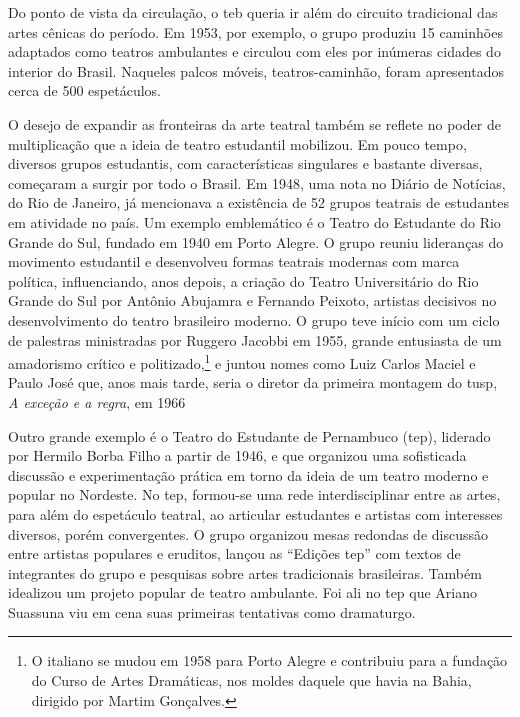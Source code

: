 Do ponto de vista da circulação, o {\sc teb} queria ir além do circuito
tradicional das artes cênicas do período. Em 1953, por exemplo, o grupo
produziu 15 caminhões adaptados como teatros ambulantes e circulou com
eles por inúmeras cidades do interior do Brasil. Naqueles palcos móveis,
teatros-caminhão, foram apresentados cerca de 500 espetáculos.

\subject{Constituição de uma cena estudantil no teatro brasileiro dos anos
1940 e 1950}

O desejo de expandir as fronteiras da arte teatral também se reflete no
poder de multiplicação que a ideia de teatro estudantil mobilizou. Em
pouco tempo, diversos grupos estudantis, com características singulares
e bastante diversas, começaram a surgir por todo o Brasil. Em 1948, uma
nota no Diário de Notícias, do Rio de Janeiro, já mencionava a
existência de 52 grupos teatrais de estudantes em atividade no país. Um
exemplo emblemático é o Teatro do Estudante do Rio Grande do Sul,
fundado em 1940 em Porto Alegre. O grupo reuniu lideranças do movimento
estudantil e desenvolveu formas teatrais modernas com marca política,
influenciando, anos depois, a criação do Teatro Universitário do Rio
Grande do Sul por Antônio Abujamra e Fernando Peixoto, artistas
decisivos no desenvolvimento do teatro brasileiro moderno. O grupo teve
início com um ciclo de palestras ministradas por Ruggero Jacobbi em
1955, grande entusiasta de um amadorismo crítico e
politizado,\footnote{O italiano se mudou em 1958 para Porto Alegre e
  contribuiu para a fundação do Curso de Artes Dramáticas, nos moldes
  daquele que havia na Bahia, dirigido por Martim Gonçalves.} e juntou
nomes como Luiz Carlos Maciel e Paulo José que, anos mais tarde, seria o
diretor da primeira montagem do {\sc tusp}, {\it A exceção e a regra}, em 1966

Outro grande exemplo é o Teatro do Estudante de Pernambuco ({\sc tep}),
liderado por Hermilo Borba Filho a partir de 1946, e que organizou uma
sofisticada discussão e experimentação prática em torno da ideia de um
teatro moderno e popular no Nordeste. No {\sc tep}, formou-se uma rede
interdisciplinar entre as artes, para além do espetáculo teatral, ao
articular estudantes e artistas com interesses diversos, porém
convergentes. O grupo organizou mesas redondas de discussão entre
artistas populares e eruditos, lançou as “Edições {\sc tep}” com textos de
integrantes do grupo e pesquisas sobre artes tradicionais brasileiras.
Também idealizou um projeto popular de teatro ambulante. Foi ali no {\sc tep}
que Ariano Suassuna viu em cena suas primeiras tentativas como
dramaturgo.

